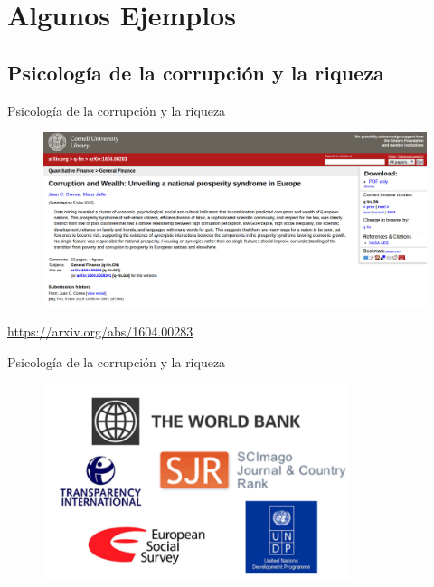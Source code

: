 \documentclass{beamer}
\begin{document}
\section{Algunos Ejemplos}
\subsection{Psicología de la corrupción y la riqueza}
\begin{frame}{Psicología de la corrupción y la riqueza}
\begin{figure}
\centering
 \includegraphics[width=1\textwidth]{Case_1}
 \end{figure}
 \textcolor{blue}{\url{https://arxiv.org/abs/1604.00283}}
 \end{frame}

\begin{frame}{Psicología de la corrupción y la riqueza}
\begin{figure}
\centering
 \includegraphics[width=0.8\textwidth]{data}
 \end{figure}
\end{frame}
\end{document}
